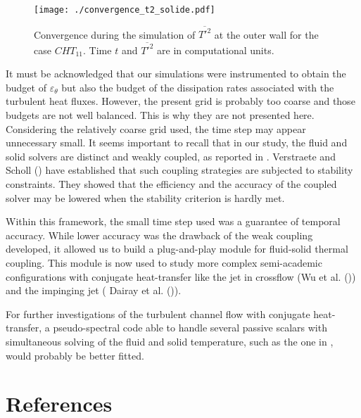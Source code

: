 \documentclass[review]{elsarticle}
\begin{document}
\begin{figure}[htbp]
\centering
\texttt{[image: ./convergence\_t2\_solide.pdf]}
\caption{Convergence during the simulation of $\overline{T'^2}$ at the outer wall for the case $CHT_{11}$. Time $t$ and $\overline{T'^2}$ are in computational units.}
\label{fig-convergence}
\end{figure}

It must be acknowledged that our simulations were instrumented to obtain the budget of $\varepsilon_\theta$ but also the budget of the dissipation rates associated with the turbulent heat fluxes.
However, the present grid is probably too coarse and those budgets are not well balanced.
This is why they are not presented here.
Considering the relatively coarse grid used, the time step may appear unnecessary small.
It seems important to recall that in our study, the fluid and solid solvers are distinct and weakly coupled, as reported in \cite{flageul2015dns}.
Verstraete and Scholl (\cite{verstraete2016stability}) have established that such coupling strategies are subjected to stability constraints.
They showed that the efficiency and the accuracy of the coupled solver may be lowered when the stability criterion is hardly met.

Within this framework, the small time step used was a guarantee of temporal accuracy.
While lower accuracy was the drawback of the weak coupling developed, it allowed us to build a plug-and-play module for fluid-solid thermal coupling.
This module is now used to study more complex semi-academic configurations with conjugate heat-transfer like the jet in crossflow (Wu et al. (\cite{wu2017direct})) and the impinging jet ( Dairay et al. (\cite{dairay2015direct})).

For further investigations of the turbulent channel flow with conjugate heat-transfer, a pseudo-spectral code able to handle several passive scalars with simultaneous solving of the fluid and solid temperature, such as the one in \citep{Tiselj2001dns}, would probably be better fitted.

\section*{References}


\end{document}
